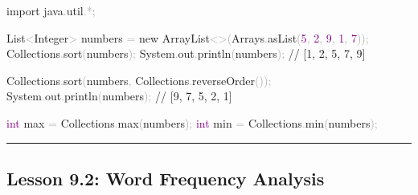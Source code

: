 \documentclass[
  justified,
  openright,
]{tufte-book}
\newcommand{\BuiltInTok}[1]{#1}
\newcommand{\CommentTok}[1]{\textcolor{MidGray}{#1}}
\newcommand{\DataTypeTok}[1]{\textcolor{Purple}{#1}}
\newcommand{\DecValTok}[1]{\textcolor{Purple}{#1}}
\newcommand{\FunctionTok}[1]{\textcolor{BrandBlue}{#1}}
\newcommand{\ImportTok}[1]{\textcolor{BrandAccent}{#1}}
\newcommand{\KeywordTok}[1]{\textcolor{BrandBlue}{#1}}
\newcommand{\NormalTok}[1]{#1}
\newcommand{\OperatorTok}[1]{\textcolor{DarkGray}{#1}}
\newenvironment{Shaded}{%
  \begin{snugshade}
}{%
  \end{snugshade}
}
\begin{document}
\begin{Shaded}
\begin{Highlighting}[]
\KeywordTok{import} \ImportTok{java}\OperatorTok{.}\ImportTok{util}\OperatorTok{.*;}

\BuiltInTok{List}\OperatorTok{\textless{}}\BuiltInTok{Integer}\OperatorTok{\textgreater{}}\NormalTok{ numbers }\OperatorTok{=} \KeywordTok{new} \BuiltInTok{ArrayList}\OperatorTok{\textless{}\textgreater{}(}\BuiltInTok{Arrays}\OperatorTok{.}\FunctionTok{asList}\OperatorTok{(}\DecValTok{5}\OperatorTok{,} \DecValTok{2}\OperatorTok{,} \DecValTok{9}\OperatorTok{,} \DecValTok{1}\OperatorTok{,} \DecValTok{7}\OperatorTok{));}
\BuiltInTok{Collections}\OperatorTok{.}\FunctionTok{sort}\OperatorTok{(}\NormalTok{numbers}\OperatorTok{);}
\BuiltInTok{System}\OperatorTok{.}\FunctionTok{out}\OperatorTok{.}\FunctionTok{println}\OperatorTok{(}\NormalTok{numbers}\OperatorTok{);}   \CommentTok{// [1, 2, 5, 7, 9]}

\BuiltInTok{Collections}\OperatorTok{.}\FunctionTok{sort}\OperatorTok{(}\NormalTok{numbers}\OperatorTok{,} \BuiltInTok{Collections}\OperatorTok{.}\FunctionTok{reverseOrder}\OperatorTok{());}
\BuiltInTok{System}\OperatorTok{.}\FunctionTok{out}\OperatorTok{.}\FunctionTok{println}\OperatorTok{(}\NormalTok{numbers}\OperatorTok{);}   \CommentTok{// [9, 7, 5, 2, 1]}

\DataTypeTok{int}\NormalTok{ max }\OperatorTok{=} \BuiltInTok{Collections}\OperatorTok{.}\FunctionTok{max}\OperatorTok{(}\NormalTok{numbers}\OperatorTok{);}
\DataTypeTok{int}\NormalTok{ min }\OperatorTok{=} \BuiltInTok{Collections}\OperatorTok{.}\FunctionTok{min}\OperatorTok{(}\NormalTok{numbers}\OperatorTok{);}
\end{Highlighting}
\end{Shaded}

\begin{center}\rule{0.5\linewidth}{0.5pt}\end{center}

\subsection{Lesson 9.2: Word Frequency
Analysis}\label{lesson-9.2-word-frequency-analysis}
\end{document}
